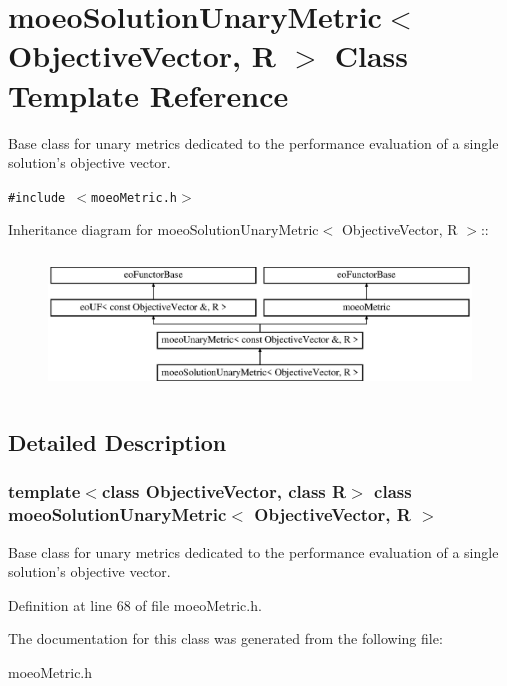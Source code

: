 \section{moeo\-Solution\-Unary\-Metric$<$ Objective\-Vector, R $>$ Class Template Reference}
\label{classmoeoSolutionUnaryMetric}
Base class for unary metrics dedicated to the performance evaluation of a single solution's objective vector.  


{\tt \#include $<$moeo\-Metric.h$>$}

Inheritance diagram for moeo\-Solution\-Unary\-Metric$<$ Objective\-Vector, R $>$::\begin{figure}[H]
\begin{center}
\leavevmode
\includegraphics[height=3.70861cm]{classmoeoSolutionUnaryMetric}
\end{center}
\end{figure}


\subsection{Detailed Description}
\subsubsection*{template$<$class Objective\-Vector, class R$>$ class moeo\-Solution\-Unary\-Metric$<$ Objective\-Vector, R $>$}

Base class for unary metrics dedicated to the performance evaluation of a single solution's objective vector. 



Definition at line 68 of file moeo\-Metric.h.

The documentation for this class was generated from the following file:\begin{CompactItemize}
\item 
moeo\-Metric.h\end{CompactItemize}
